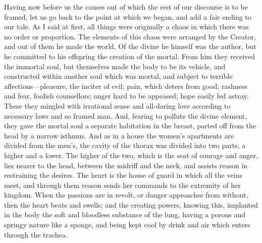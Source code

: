 Having now before us the causes out of which the rest of our discourse is
to be framed, let us go back to the point at which we began, and add a
fair ending to our tale. As I said at first, all things were originally a
chaos in which there was no order or proportion. The elements of this
chaos were arranged by the Creator, and out of them he made the world. Of
the divine he himself was the author, but he committed to his offspring
the creation of the mortal. From him they received the immortal soul, but
themselves made the body to be its vehicle, and constructed within another
soul which was mortal, and subject to terrible affections—pleasure,
the inciter of evil; pain, which deters from good; rashness and fear,
foolish counsellors; anger hard to be appeased; hope easily led astray.
These they mingled with irrational sense and all-daring love according to
necessary laws and so framed man. And, fearing to pollute the divine
element, they gave the mortal soul a separate habitation in the breast,
parted off from the head by a narrow isthmus. And as in a house the
women’s apartments are divided from the men’s, the cavity of the thorax
was divided into two parts, a higher and a lower. The higher of the two,
which is the seat of courage and anger, lies nearer to the head, between
the midriff and the neck, and assists reason in restraining the desires.
The heart is the house of guard in which all the veins meet, and through
them reason sends her commands to the extremity of her kingdom. When the
passions are in revolt, or danger approaches from without, then the heart
beats and swells; and the creating powers, knowing this, implanted in the
body the soft and bloodless substance of the lung, having a porous and
springy nature like a sponge, and being kept cool by drink and air which
enters through the trachea.

